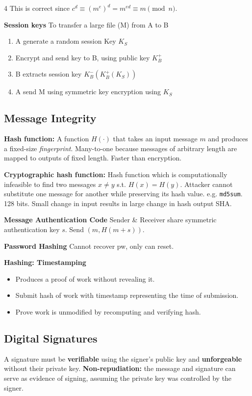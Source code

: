 \documentclass[10pt]{extarticle}
\begin{document}
\begin{multicols}{4}
This is correct since $c^d \equiv (m^e)^d = m^{ed} \equiv m \pmod n$.

\textbf{Session keys}
To transfer a large file (M) from A to B
\begin{enumerate}
\item A generate a random session Key $K_S$
\item Encrypt and send key to B, using public key $K_B^+$
\item B extracts session key $K_B^-(K_B^+(K_S))$
\item A send M using symmetric key encryption using $K_S$
\end{enumerate}

\subsection{Message Integrity}
\textbf{Hash function:} A function $H(\cdot)$ that takes an input message $m$ and produces a fixed-size \emph{fingerprint}. Many-to-one because messages of arbitrary length are mapped to outputs of fixed length. Faster than encryption.

\textbf{Cryptographic hash function:} Hash function which is computationally infeasible to find two messages $x \neq y$ s.t. $H(x) = H(y)$. Attacker cannot substitute one message for another while preserving its hash value. e.g. \texttt{md5sum}. 128 bits. Small change in input results in large change in hash output SHA.

\textbf{Message Authentication Code} Sender \& Receiver share symmetric authentication key $s$. Send $(m, H(m + s))$.

\textbf{Password Hashing} Cannot recover pw, only can reset.

\textbf{Hashing: Timestamping}
\begin{itemize}
\item Produces a proof of work without revealing it.
\item Submit hash of work with timestamp representing the time of submission.
\item Prove work is unmodified by recomputing and verifying hash.
\end{itemize}

\subsection{Digital Signatures}
A signature must be \textbf{verifiable} using the signer's public key and \textbf{unforgeable} without their private key. \textbf{Non-repudiation:} the message and signature can serve as evidence of signing, assuming the private key was controlled by the signer.


\end{multicols}
\end{document}
